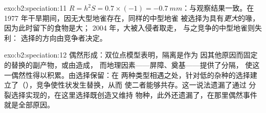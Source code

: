\begin{solution}{exo:b2:speciation:11}
$R = h^{2}S = 0.7\times(-1) = \qty{-0.7}{mm}$：与观察结果一致。在
1977 年干旱期间，因无大型地雀存在，同样的中型地雀
被选择为具有\emph{更大}的喙，因为此时留下的食物是大；
2004 年，大被入侵者取走，
与之竞争的中型地雀则失利：
选择的方向由竞争者决定。
\end{solution}

\begin{solution}{exo:b2:speciation:12}
偶然形成：双位点模型表明，隔离是作为
因其他原因而固定的替换的副产物，或由造成，
而地理因素——屏障、奠基——提供了分隔，
使这一偶然性得以积累。由选择保留：在
两种类型相遇之处，针对低的杂种的选择建立了（），竞争使性状发生替换，从而
使二者能够共存。这一说法遗漏了通过
分裂选择实现的，在这里选择既创造又维持
物种，此外还遗漏了，在那里偶然事件就是全部原因。
\end{solution}

